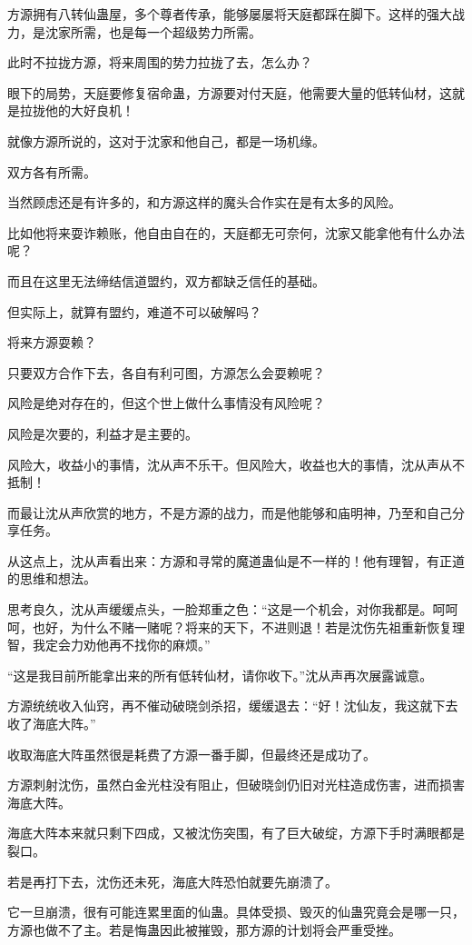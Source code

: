 \begin{this_body}
方源拥有八转仙蛊屋，多个尊者传承，能够屡屡将天庭都踩在脚下。这样的强大战力，是沈家所需，也是每一个超级势力所需。

此时不拉拢方源，将来周围的势力拉拢了去，怎么办？

眼下的局势，天庭要修复宿命蛊，方源要对付天庭，他需要大量的低转仙材，这就是拉拢他的大好良机！

就像方源所说的，这对于沈家和他自己，都是一场机缘。

双方各有所需。

当然顾虑还是有许多的，和方源这样的魔头合作实在是有太多的风险。

比如他将来耍诈赖账，他自由自在的，天庭都无可奈何，沈家又能拿他有什么办法呢？

而且在这里无法缔结信道盟约，双方都缺乏信任的基础。

但实际上，就算有盟约，难道不可以破解吗？

将来方源耍赖？

只要双方合作下去，各自有利可图，方源怎么会耍赖呢？

风险是绝对存在的，但这个世上做什么事情没有风险呢？

风险是次要的，利益才是主要的。

风险大，收益小的事情，沈从声不乐干。但风险大，收益也大的事情，沈从声从不抵制！

而最让沈从声欣赏的地方，不是方源的战力，而是他能够和庙明神，乃至和自己分享任务。

从这点上，沈从声看出来：方源和寻常的魔道蛊仙是不一样的！他有理智，有正道的思维和想法。

思考良久，沈从声缓缓点头，一脸郑重之色：“这是一个机会，对你我都是。呵呵呵，也好，为什么不赌一赌呢？将来的天下，不进则退！若是沈伤先祖重新恢复理智，我定会力劝他再不找你的麻烦。”

“这是我目前所能拿出来的所有低转仙材，请你收下。”沈从声再次展露诚意。

方源统统收入仙窍，再不催动破晓剑杀招，缓缓退去：“好！沈仙友，我这就下去收了海底大阵。”

收取海底大阵虽然很是耗费了方源一番手脚，但最终还是成功了。

方源刺射沈伤，虽然白金光柱没有阻止，但破晓剑仍旧对光柱造成伤害，进而损害海底大阵。

海底大阵本来就只剩下四成，又被沈伤突围，有了巨大破绽，方源下手时满眼都是裂口。

若是再打下去，沈伤还未死，海底大阵恐怕就要先崩溃了。

它一旦崩溃，很有可能连累里面的仙蛊。具体受损、毁灭的仙蛊究竟会是哪一只，方源也做不了主。若是悔蛊因此被摧毁，那方源的计划将会严重受挫。


\end{this_body}

